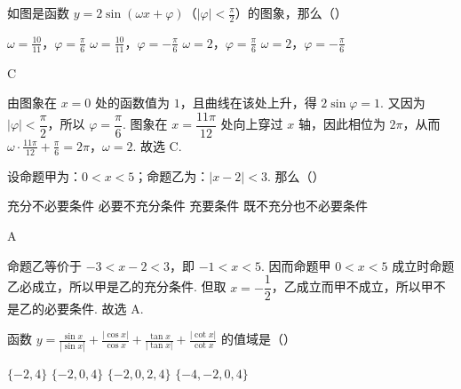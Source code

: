 \documentclass[UTF8,a4paper,oneside,11pt]{ctexbook}
\begin{document}
\begin{problem}
如图是函数 \(y=2\sin\left( \omega x+\varphi \right)\)（\(\left| \varphi \right|<\frac{\pi}{2}\)）的图象，那么（\quad）


\choices
    {\(\omega=\frac{10}{11}\)，\(\varphi=\frac{\pi}{6}\)}
    {\(\omega=\frac{10}{11}\)，\(\varphi=-\frac{\pi}{6}\)}
    {\(\omega=2\)，\(\varphi=\frac{\pi}{6}\)}
    {\(\omega=2\)，\(\varphi=-\frac{\pi}{6}\)}
\end{problem}

\begin{answer}C\end{answer}

\begin{solution}
由图象在 \(x=0\) 处的函数值为 \(1\)，且曲线在该处上升，得 \(2\sin\varphi=1\). 又因为 \(\left|\varphi\right|<\dfrac\pi2\)，所以 \(\varphi=\dfrac\pi6\). 图象在 \(x=\dfrac{11\pi}{12}\) 处向上穿过 \(x\) 轴，因此相位为 \(2\pi\)，从而
\(\omega\cdot\frac{11\pi}{12}+\frac\pi6=2\pi\)，\(\omega=2\).
故选 C.
\end{solution}


\begin{problem}
设命题甲为：\(0<x<5\)；命题乙为：\(\left| x-2 \right|<3\). 那么（\quad）

\choices
    {充分不必要条件}
    {必要不充分条件}
    {充要条件}
    {既不充分也不必要条件}
\end{problem}

\begin{answer}A\end{answer}

\begin{solution}
命题乙等价于 \(-3<x-2<3\)，即 \(-1<x<5\). 因而命题甲 \(0<x<5\) 成立时命题乙必成立，所以甲是乙的充分条件. 但取 \(x=-\dfrac12\)，乙成立而甲不成立，所以甲不是乙的必要条件. 故选 A.
\end{solution}


\begin{problem}
函数 \(y=\frac{\sin x}{\left| \sin x \right|}+\frac{\left| \cos x \right|}{\cos x}+\frac{\tan x}{\left| \tan x \right|}+\frac{\left| \cot x \right|}{\cot x}\) 的值域是（\quad）

\choices
    {\(\{-2,4\}\)}
    {\(\{-2,0,4\}\)}
    {\(\{-2,0,2,4\}\)}
    {\(\{-4,-2,0,4\}\)}
\end{problem}
\end{document}
